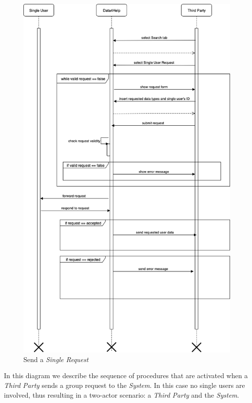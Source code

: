 \documentclass[titlepage]{article}
\begin{document}
\begin{figure}[H]
			\center
  			\includegraphics[width=\textwidth]{Diagrammi/sd3.png}
			\caption{Send a {\it Single Request}}
			\label{fig:sd3}
\end{figure}
In this diagram we describe the sequence of procedures that are activated when a {\it Third Party} sends a group request to the {\it System}. In this case no single users are involved, thus resulting in a two-actor scenario: a {\it Third Party} and the {\it System}.
\end{document}
